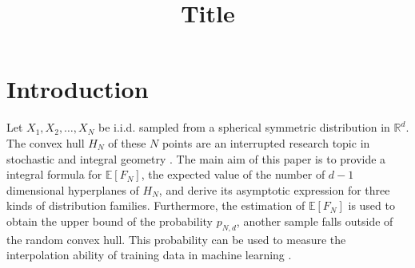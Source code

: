 \documentclass{aptpub}
\def\E{\mathbb{E}}
\begin{document}

\title{Title} %




\begin{abstract}
\end{abstract}

\keywords{}%

\ams{}{}%


\section{Introduction} %


Let $X_1, X_2, \dots, X_N$ be i.i.d. sampled from a spherical symmetric distribution in $\mathbb{R}^d$.
The convex hull $H_N$ of these $N$ points are an interrupted research topic in stochastic and integral geometry
\cite{schneider2008stochastic}.
The main aim of this paper is to provide a integral formula for $\E[F_N]$, the expected value of the number of $d-1$ dimensional hyperplanes
of $H_N$,
and derive its asymptotic expression
for three kinds of distribution families. Furthermore, the estimation of $\E[F_N]$ is used to obtain the upper bound
of the probability $p_{N,d}$, another sample falls outside of the random convex hull. This probability can be used to
measure the interpolation ability of training data in machine learning
\cite{balestriero2021learning}.
\end{document}
